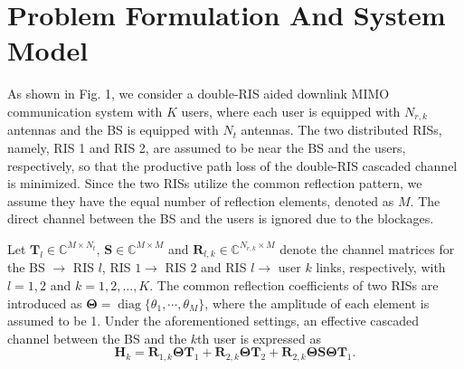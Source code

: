 \documentclass[journal]{IEEEtran}
\begin{document}
\vspace{-2.3mm}

\section{  Problem Formulation And System Model}
As shown in Fig. 1, we consider a double-RIS aided downlink MIMO communication system with ${K}$ users, where each user is equipped with ${N}_{r,k}$ antennas and the BS is equipped with ${N}_{t}$ antennas.
The two distributed RISs, namely, RIS 1 and RIS 2, are assumed to be near the BS and the users, respectively, so that the productive path loss of the double-RIS cascaded channel is minimized\cite{9714463}. Since the two RISs utilize the common reflection pattern, we assume they have the equal number of reflection elements, denoted as $M$. The direct channel between the BS and the users is ignored due to the blockages.

Let $\mathbf {T}_{l}\in \mathbb {C}^{M\times N_{t}}$, $\mathbf {S}\in \mathbb {C}^{M\times M}$ and $\mathbf {R}_{l,k}\in \mathbb {C}^{N_{r,k}\times M}$ denote the channel matrices for the  BS $\rightarrow$ RIS ${l}$, RIS ${1\rightarrow}$  RIS ${2}$ and RIS ${l\rightarrow}$ user ${k}$ links, respectively, with $l=1,2$ and $k=1,2,...,K$.
The common reflection coefficients of two RISs are introduced as ${ \boldsymbol \Theta } =  \mathop {\mathrm {diag}}\nolimits \{\theta  _{1},\cdots,\theta  _{M}\}$, where the amplitude of each element is assumed to be 1.
Under the aforementioned settings, an effective cascaded channel between the BS and the ${k}$th user is expressed as
\begin{equation} \mathbf {H}_{k} =\mathbf {R}_{1,k} \boldsymbol {\Theta }\mathbf {T}_{1}+
  \mathbf {R}_{2,k} \boldsymbol {\Theta  }\mathbf {T}_{2}+
  \mathbf {R}_{2,k} \boldsymbol {\Theta }\mathbf {S} \boldsymbol {\Theta  }\mathbf {T}_{1}. 
  \label{channel}\end{equation}
\end{document}
